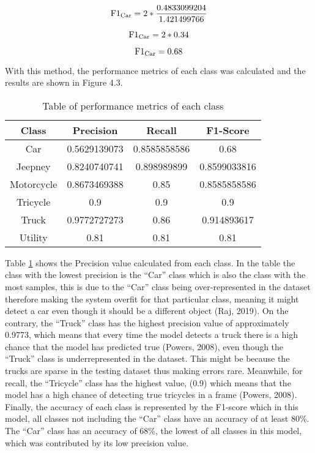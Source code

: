 \[{\text{F1}\textsubscript{Car}}= 2 * \frac{0.4833099204}{1.421499766} \]

\[{\text{F1}\textsubscript{Car}}= 2 * 0.34 \]

\[{\text{F1}\textsubscript{Car}}= 0.68 \]

With this method, the performance metrics of each class was calculated and the results are shown in Figure 4.3. 


\begin{table}[ht]   %
	\centering
	\caption{Table of performance metrics of each class} \vspace{0.25em}
	\begin{tabular}{|c|c|c|c|} \hline
		\centering Class & Precision & Recall & F1-Score \\ \hline
		Car & 0.5629139073 & 0.8585858586  & 0.68 \\ \hline
		Jeepney & 0.8240740741 & 0.898989899  & 0.8599033816\\ \hline
		Motorcycle& 0.8673469388  & 0.85   & 0.8585858586 \\ \hline
		Tricycle   & 0.9   & 0.9 & 0.9 \\ \hline
		Truck & 0.9772727273 & 0.86 & 0.914893617 \\ \hline
		Utility & 0.81 & 0.81 & 0.81 \\ \hline
		
	\end{tabular}
	\label{tab:perf_mat}
\end{table}


Table \ref{tab:perf_mat} shows the Precision value calculated from each class. In the table the class with the lowest precision is the “Car” class which is also the class with the most samples, this is due to the “Car” class being over-represented in the dataset therefore making the system overfit for that particular class, meaning it might detect a car even though it should be a different object (Raj, 2019). On the contrary, the “Truck” class has the highest precision value of approximately 0.9773, which means that every time the model detects a truck there is a high chance that the model has predicted true (Powers, 2008), even though the “Truck” class is underrepresented in the dataset. This might be because the trucks are sparse in the testing dataset thus making errors rare. Meanwhile, for recall, the “Tricycle” class has the highest value, (0.9) which means that the model has a high chance of detecting true tricycles in a frame (Powers, 2008). Finally, the accuracy of each class is represented by the F1-score which in this model, all classes not including the “Car” class have an accuracy of at least 80\%. The “Car” class has an accuracy of 68\%, the lowest of all classes in this model, which was contributed by its low precision value.




